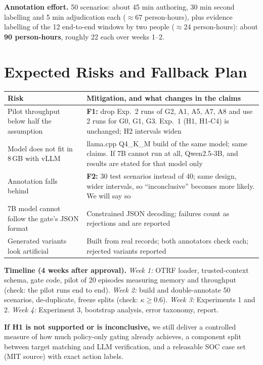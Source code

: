 \documentclass[11pt,a4paper]{article}
\begin{document}
\textbf{Annotation effort.} 50 scenarios: about 45 min authoring, 30 min second labelling and 5 min adjudication each ($\approx$67 person-hours), plus evidence labelling of the 12 end-to-end windows by two people ($\approx$24 person-hours): about \textbf{90 person-hours}, roughly 22 each over weeks 1--2.

\section{Expected Risks and Fallback Plan}
{\small
\begin{tabularx}{\linewidth}{@{}LL@{}}
\toprule
\textbf{Risk} & \textbf{Mitigation, and what changes in the claims}\\
\midrule
Pilot throughput below half the assumption & \textbf{F1:} drop Exp.~2 runs of G2, A1, A5, A7, A8 and use 2 runs for G0, G1, G3. Exp.~1 (H1, H1-C4) is unchanged; H2 intervals widen \\
Model does not fit in 8\,GB with vLLM & llama.cpp Q4\_K\_M build of the same model; same claims. If 7B cannot run at all, Qwen2.5-3B, and results are stated for that model only \\
Annotation falls behind & \textbf{F2:} 30 test scenarios instead of 40; same design, wider intervals, so ``inconclusive'' becomes more likely. We will say so \\
7B model cannot follow the gate's JSON format & Constrained JSON decoding; failures count as rejections and are reported \\
Generated variants look artificial & Built from real records; both annotators check each; rejected variants reported \\
\bottomrule
\end{tabularx}}

\textbf{Timeline (4 weeks after approval).} \emph{Week 1:} OTRF loader, trusted-context schema, gate code, pilot of 20 episodes measuring memory and throughput (check: the pilot runs end to end). \emph{Week 2:} build and double-annotate 50 scenarios, de-duplicate, freeze splits (check: $\kappa\geq0.6$). \emph{Week 3:} Experiments 1 and 2. \emph{Week 4:} Experiment 3, bootstrap analysis, error taxonomy, report.

\textbf{If H1 is not supported or is inconclusive,} we still deliver a controlled measure of how much policy-only gating already achieves, a component split between target matching and LLM verification, and a releasable SOC case set (MIT source) with exact action labels.
\end{document}
